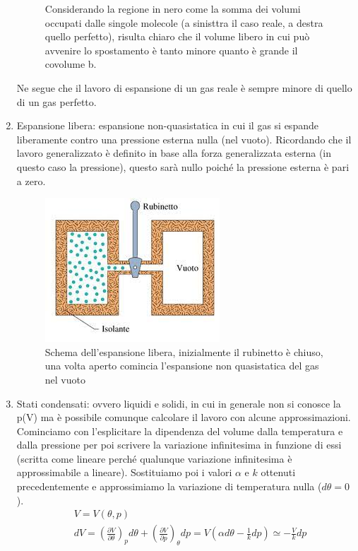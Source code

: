 \documentclass[10pt,a4paper]{article}
\begin{document}
\begin{enumerate}
\begin{figure}[h!]
	\caption{Considerando la regione in nero come la somma dei volumi occupati dalle singole molecole (a sinisttra il caso reale, a destra quello perfetto), risulta chiaro che il volume libero in cui può avvenire lo spostamento è tanto minore quanto è grande il covolume b.}
	\label{fig:lavorocovolume}
\end{figure}
\FloatBarrier
Ne segue che il lavoro di espansione di un gas reale è sempre minore di quello di un gas perfetto.
\item Espansione libera: espansione non-quasistatica in cui il gas si espande liberamente contro una pressione esterna nulla (nel vuoto). Ricordando che il lavoro generalizzato è definito in base alla forza generalizzata esterna (in questo caso la pressione), questo sarà nullo poiché la pressione esterna è pari a zero. 
	\begin{figure}[h!]
		\centering
		\includegraphics[width=0.5\linewidth]{../images/espansione_libera}
		\caption{Schema dell'espansione libera, inizialmente il rubinetto è chiuso, una volta aperto comincia l'espansione non quasistatica del gas nel vuoto}
		\label{fig:espansione_libera}
	\end{figure}
	\FloatBarrier
	\item Stati condensati: ovvero liquidi e solidi, in cui in generale non si conosce la p(V) ma è possibile comunque calcolare il lavoro con alcune approssimazioni. Cominciamo con l'esplicitare la dipendenza del volume dalla temperatura e dalla pressione per poi scrivere la variazione infinitesima in funzione di essi (scritta come lineare perché qualunque variazione infinitesima è approssimabile a lineare). Sostituiamo poi i valori $\alpha$ e $k$ ottenuti precedentemente e approssimiamo la variazione di temperatura nulla ($d\theta = 0$).  
	\begin{align*}
		&V = V(\theta, p)\\
		&dV = \left(\frac{\partial V}{\partial \theta}\right)_p d\theta + \left(\frac{\partial V}{\partial p}\right)_{\theta} dp = V(\alpha d\theta-\frac{1}{k} dp)\simeq-\frac{V}{k}dp\\

\end{align*}
\end{enumerate}
\end{document}

